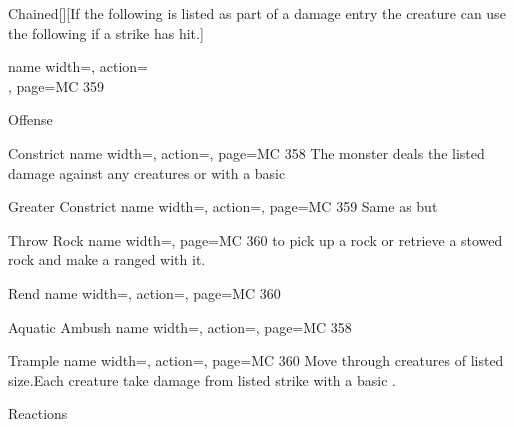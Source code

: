 \begin{PageFront}
\begin{Table}{Chained}[][If the following is listed as part of a damage entry the creature can use the following if a strike has hit.]
\begin{entry}{}{%
            name width=\monsterLength,%
            action={ \\},
            page={MC 359}
        }
        \end{entry}
    \end{Table}
    \begin{Table}{Offense}
        \begin{entry}{Constrict}{%
            name width=\monsterLength,%
            action={},
            page={MC 358}
        }
            The monster deals the listed damage against any creatures \Grabbed or \Restrained with a basic \Fortitude[][before=Listed]
        \end{entry}
        \begin{entry}{Greater Constrict}{%
            name width=\monsterLength,%
            action={},
            page={MC 359}
        }
            Same as  but 
        \end{entry}
        \begin{entry}{Throw Rock}{%
            name width=\monsterLength,%
            page={MC 360}
        }
             to pick up a rock or retrieve a stowed rock and make a ranged  with it.
        \end{entry}
        \begin{entry}{Rend}{%
            name width=\monsterLength,%
            action={},
            page={MC 360}
        }
             \hfill
        \end{entry}
        \begin{entry}{Aquatic Ambush}{%
            name width=\monsterLength,%
            action={},
            page={MC 358}
        }
            \hfill
        \end{entry}
        \begin{entry}{Trample}{%
            name width=\monsterLength,%
            action={},
            page={MC 360}
        }
            Move  through creatures of listed size.\hfill Each creature take damage from listed strike with a basic \Fortitude[][before=Listed].
        \end{entry}
    \end{Table}
    \begin{Table}{Reactions}

\end{Table}
\end{PageFront}
